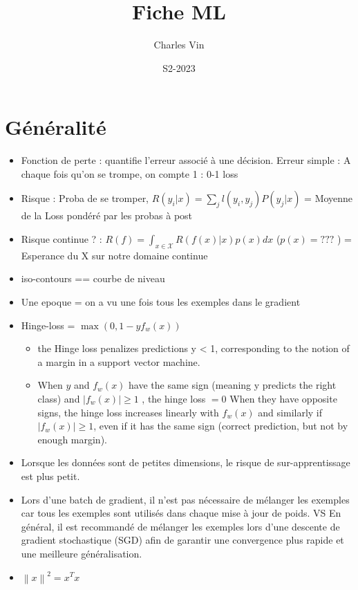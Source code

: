 \documentclass{article}
\title{Fiche ML}
\author{Charles Vin}
\date{S2-2023}
\theoremstyle{plain}%
\theoremstyle{definition}
\theoremstyle{remark}
\begin{document}
\maketitle
\section{Généralité}
\begin{itemize}
    \item Fonction de perte : quantifie l'erreur associé à une décision. Erreur simple : A chaque fois qu'on se trompe, on compte 1 : 0-1 loss
    \item Risque : Proba de se tromper, $ R(y_i | x) = \sum_{j}^{} l(y_i, y_j)P(y_j | x)$ = Moyenne de la Loss pondéré par les probas à post
    \item Risque continue ? : $ R(f) = \int_{x \in \mathcal{X}}^{}R(f(x)|x)p(x) dx  $ ($ p(x) = ??? $ ) = Esperance du X sur notre domaine continue
    \item iso-contours == courbe de niveau
    \item Une epoque = on a vu une fois tous les exemples dans le gradient
    \item Hinge-loss = $ \max (0, 1 - y f_w(x)) $ \begin{itemize}
        \item the Hinge loss penalizes predictions y < 1, corresponding to the notion of a margin in a support vector machine.
        \item When $ y $ and $ f_w(x) $ have the same sign (meaning y predicts the right class) and $ \left| f_w(x) \right| \geq 1 $ , the hinge loss $ = 0 $  When they have opposite signs, the hinge loss increases linearly with $ f_w(x) $  and similarly if $ \left| f_w(x) \right| \geq 1 $, even if it has the same sign (correct prediction, but not by enough margin).
    \end{itemize}
    \item Lorsque les données sont de petites dimensions, le risque de sur-apprentissage est plus petit.
    \item Lors d'une batch de gradient, il n'est pas nécessaire de mélanger les exemples car tous les exemples sont utilisés dans chaque mise à jour de poids. VS En général, il est recommandé de mélanger les exemples lors d'une descente de gradient stochastique (SGD) afin de garantir une convergence plus rapide et une meilleure généralisation.
    \item $ \left\| x \right\|^2 = x^T x $ 
\end{itemize}
\end{document}

